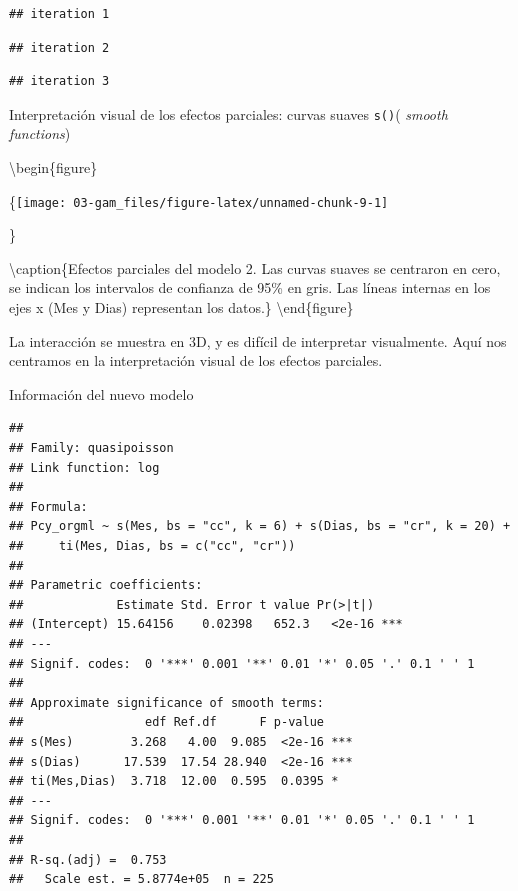 \documentclass[
]{book}
\newenvironment{Shaded}{\begin{snugshade}}{\end{snugshade}}
\newcommand{\AttributeTok}[1]{\textcolor[rgb]{0.77,0.63,0.00}{#1}}
\newcommand{\DecValTok}[1]{\textcolor[rgb]{0.00,0.00,0.81}{#1}}
\newcommand{\FunctionTok}[1]{\textcolor[rgb]{0.00,0.00,0.00}{#1}}
\newcommand{\NormalTok}[1]{#1}
\newcommand{\SpecialCharTok}[1]{\textcolor[rgb]{0.00,0.00,0.00}{#1}}
\begin{document}
\begin{verbatim}
## iteration 1
\end{verbatim}

\begin{verbatim}
## iteration 2
\end{verbatim}

\begin{verbatim}
## iteration 3
\end{verbatim}

Interpretación visual de los efectos parciales: curvas suaves \texttt{s()}( \emph{smooth functions})

\begin{Shaded}
\end{Shaded}

\textbackslash begin\{figure\}

\{\centering \texttt{[image: 03-gam\_files/figure-latex/unnamed-chunk-9-1]}

\}

\textbackslash caption\{Efectos parciales del modelo 2. Las curvas suaves se centraron en cero, se indican los intervalos de confianza de 95\% en gris. Las líneas internas en los ejes x (Mes y Dias) representan los datos.\}\label{fig:unnamed-chunk-9}
\textbackslash end\{figure\}

La interacción se muestra en 3D, y es difícil de interpretar visualmente. Aquí nos centramos en la interpretación visual de los efectos parciales.

Información del nuevo modelo

\begin{Shaded}
\end{Shaded}

\begin{verbatim}
## 
## Family: quasipoisson 
## Link function: log 
## 
## Formula:
## Pcy_orgml ~ s(Mes, bs = "cc", k = 6) + s(Dias, bs = "cr", k = 20) + 
##     ti(Mes, Dias, bs = c("cc", "cr"))
## 
## Parametric coefficients:
##             Estimate Std. Error t value Pr(>|t|)    
## (Intercept) 15.64156    0.02398   652.3   <2e-16 ***
## ---
## Signif. codes:  0 '***' 0.001 '**' 0.01 '*' 0.05 '.' 0.1 ' ' 1
## 
## Approximate significance of smooth terms:
##                 edf Ref.df      F p-value    
## s(Mes)        3.268   4.00  9.085  <2e-16 ***
## s(Dias)      17.539  17.54 28.940  <2e-16 ***
## ti(Mes,Dias)  3.718  12.00  0.595  0.0395 *  
## ---
## Signif. codes:  0 '***' 0.001 '**' 0.01 '*' 0.05 '.' 0.1 ' ' 1
## 
## R-sq.(adj) =  0.753   
##   Scale est. = 5.8774e+05  n = 225
\end{verbatim}
\end{document}
